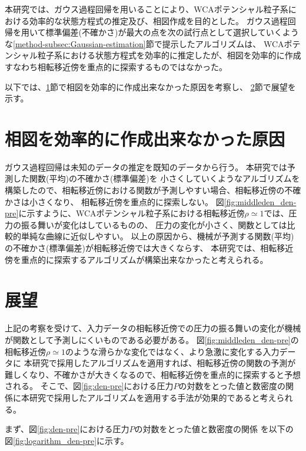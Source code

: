 \documentclass[titlepage]{jsreport}
\begin{document}
{{{本研究では、ガウス過程回帰を用いることにより、WCAポテンシャル粒子系における効率的な状態方程式の推定及び、相図作成を目的とした。
ガウス過程回帰を用いて標準偏差(不確かさ)が最大の点を次の試行点として選択していくような\ref{method-subsec:Gaussian-estimation}節で提示したアルゴリズムは、
WCAポテンシャル粒子系における状態方程式を効率的に推定したが、相図を効率的に作成すなわち相転移近傍を重点的に探索するものではなかった。

以下では、\ref{sum-sec:cause}節で相図を効率的に作成出来なかった原因を考察し、
\ref{sum-sec:outlook}節で展望を示す。


\section{相図を効率的に作成出来なかった原因}\label{sum-sec:cause}
ガウス過程回帰は未知のデータの推定を既知のデータから行う。
本研究では予測した関数(平均)の不確かさ(標準偏差)を
小さくしていくようなアルゴリズムを構築したので、相転移近傍における関数が予測しやすい場合、相転移近傍の不確かさは小さくなり、
相転移近傍を重点的に探索しない。
図\ref{fig:middleden_den-pre}に示すように、WCAポテンシャル粒子系における相転移近傍${\rho}\simeq{1}$では、圧力の振る舞いが変化はしているものの、
圧力の変化が小さく、関数としては比較的単純な曲線に近似しやすい。
以上の原因から、機械が予測する関数(平均)の不確かさ(標準偏差)が相転移近傍では大きくならす、
本研究では、相転移近傍を重点的に探索するアルゴリズムが構築出来なかったと考えられる。

\section{展望}\label{sum-sec:outlook}
上記の考察を受けて、入力データの相転移近傍での圧力の振る舞いの変化が機械が関数として予測しにくいものである必要がある。
図\ref{fig:middleden_den-pre}の相転移近傍${\rho}\simeq{1}$のような滑らかな変化ではなく、より急激に変化する入力データに
本研究で採用したアルゴリズムを適用すれば、相転移近傍の関数の予測が難しくなり、不確かさが大きくなるので、相転移近傍を重点的に探索すると予想される。
そこで、図\ref{fig:den-pre}における圧力$P$の対数をとった値と数密度の関係に本研究で採用したアルゴリズムを適用する手法が効果的であると考えられる。

まず、図\ref{fig:den-pre}における圧力$P$の対数をとった値と数密度の関係
を以下の図\ref{fig:logarithm_den-pre}に示す。

}}}
\end{document}
